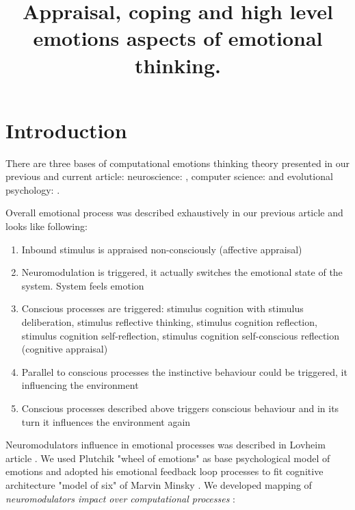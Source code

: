 \title{Appraisal, coping and high level emotions aspects of emotional thinking.}

\section{Introduction}

There are three bases of computational emotions thinking theory presented in our previous \cite{computational_emotional_thinking} and current article: neuroscience: \cite{emotionsbraintorobot, parsingreward, neuromodulatory, cubeofemotions, natureofemotions}, computer science: \cite{emotionandsociable, senticcomputing, hourglass, affectivemodelofinterplay, affectivecomputing, computationalmodelsemotion, computationalmodelsemotionscognition, evaluatingcomutationalmodel, threelevel} and evolutional psychology: \cite{natureofemotions, primer_affect_psychology, tomkins1, tomkins2, tomkins3, quest}.

Overall emotional process was described exhaustively in our previous article \cite{computational_emotional_thinking} and looks like following:

\begin{enumerate}
 \item  Inbound stimulus is appraised non-consciously (affective appraisal)
 \item  Neuromodulation is triggered, it actually switches the emotional state of the system. System feels emotion
 \item  Conscious processes are triggered: stimulus cognition with stimulus deliberation, stimulus reflective thinking, stimulus cognition reflection, stimulus cognition self-reflection, stimulus cognition self-conscious reflection (cognitive appraisal)
 \item  Parallel to conscious processes the instinctive behaviour could be triggered, it influencing the environment
 \item  Conscious processes described above triggers conscious behaviour and in its turn it influences the environment again
\end{enumerate}

Neuromodulators influence in emotional processes was described in Lovheim article \cite{cubeofemotions}. We used Plutchik "wheel of emotions" \cite{natureofemotions} as base psychological model of emotions and adopted his emotional feedback loop processes to fit cognitive architecture "model of six" of Marvin Minsky \cite{emotionmachine}. We developed mapping of \emph{neuromodulators impact over computational processes} \cite{computational_emotional_thinking}:


